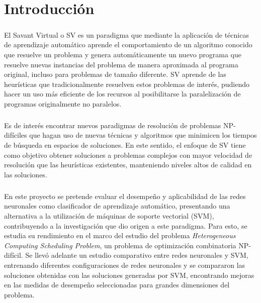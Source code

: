 \chapter{Introducción} \label{section-introduccion}

\paragraph{} El Savant Virtual o SV es un paradigma que mediante la aplicación de técnicas de aprendizaje automático aprende el comportamiento de un algoritmo conocido que resuelve un problema y genera automáticamente un nuevo programa que resuelve nuevas instancias del problema de manera aproximada al programa original, incluso para problemas de tamaño diferente. SV aprende de las heurísticas que tradicionalmente resuelven estos problemas de interés, pudiendo hacer un uso más eficiente de los recursos al posibilitarse la paralelización de programas originalmente no paralelos.

\paragraph{} Es de interés encontrar nuevos paradigmas de resolución de problemas NP-difíciles que hagan uso de nuevas técnicas y algoritmos que minimicen los tiempos de búsqueda en espacios de soluciones. En este sentido, el enfoque de SV tiene como objetivo obtener soluciones a problemas complejos con mayor velocidad de resolución que las heurísticas existentes, manteniendo niveles altos de calidad en las soluciones. 

\paragraph{} En este proyecto se pretende evaluar el desempeño y aplicabilidad de las redes neuronales como clasificador de aprendizaje automático, presentando una alternativa a la utilización de máquinas de soporte vectorial (SVM), contribuyendo a la investigación que dio origen a este paradigma. Para esto, se estudia su rendimiento en el marco del estudio del problema \textit{Heterogeneous Computing Scheduling Problem}, un problema de optimización combinatoria NP-difícil. Se llevó adelante un estudio comparativo entre redes neuronales y SVM, entrenando diferentes configuraciones de redes neuronales y se compararon las soluciones obtenidas con las soluciones generadas por SVM, encontrando mejoras en las medidas de desempeño seleccionadas para grandes dimensiones del problema.

